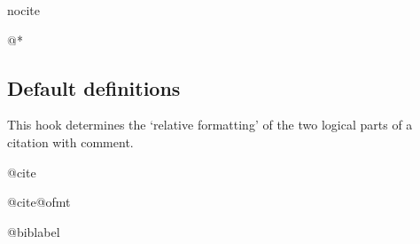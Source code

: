\begin{docCommand}{nocite}{}
\begin{teX}
  \else
       \end{teX}
       \begin{teX}
    \@eha
       \end{teX}
       \begin{teX}
  \fi
  \@esphack}
       \end{teX}
       \begin{teX}
\expandafter\let\csname b@*\endcsname\@empty
       \end{teX}
  \end{docCommand}
%
%
 \subsection{Default definitions}

    This hook determines the `relative formatting' of the two logical
    parts of a citation with comment.
    
\begin{docCommand}{@cite}{}
       \begin{teX}
\def\@cite#1#2{[{#1\if@tempswa , #2\fi}]}
       \end{teX}
  \end{docCommand}
%
 \begin{docCommand}{@cite@ofmt}{}
       \begin{teX}
\let\@cite@ofmt\hbox
       \end{teX}
  \end{docCommand}

 \begin{docCommand}{@biblabel}{}
       \begin{teX}
\def\@biblabel#1{[#1]}
       \end{teX}
  \end{docCommand}
